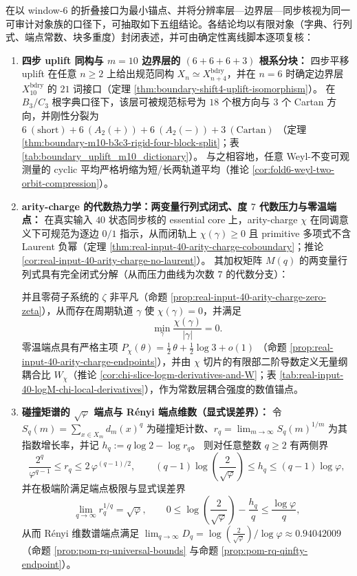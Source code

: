 \begin{theorem}\label{thm:window6-unified-skeleton}
在以 window-\(6\) 的折叠接口为最小锚点、并将分辨率层—边界层—同步核视为同一可审计对象族的口径下，可抽取如下五组结论。各结论均以有限对象（字典、行列式、端点常数、块多重度）封闭表述，并可由确定性离线脚本逐项复核：
\begin{enumerate}
  \item \textbf{四步 uplift 同构与 \(m=10\) 边界层的 \texorpdfstring{$(6+6+6+3)$}{(6+6+6+3)} 根系分块：}
  四步平移 uplift 在任意 \(n\ge 2\) 上给出规范同构 \(X_n\simeq X_{n+4}^{\mathrm{bdry}}\)，并在 \(n=6\) 时确定边界层 \(X_{10}^{\mathrm{bdry}}\) 的 \(21\) 词接口（定理 \ref{thm:boundary-shift4-uplift-isomorphism}）。
  在 \(B_3/C_3\) 根字典口径下，该层可被规范标号为 \(18\) 个根方向与 \(3\) 个 Cartan 方向，并刚性分裂为
  \(
  6\ (\mathrm{short})+6\ (A_2(+))+6\ (A_2(-))+3\ (\mathrm{Cartan})
  \)
  （定理 \ref{thm:boundary-m10-b3c3-rigid-four-block-split}；表 \ref{tab:boundary_uplift_m10_dictionary}）。
  与之相容地，任意 Weyl-不变可观测量的 cyclic 平均严格坍缩为短/长两轨道平均（推论 \ref{cor:fold6-weyl-two-orbit-compression}）。

  \item \textbf{arity-charge 的代数热力学：两变量行列式闭式、度 \(7\) 代数压力与零温端点：}
  在真实输入 \(40\) 状态同步核的 essential core 上，arity-charge \(\chi\) 在同调意义下可规范为逐边 \(0/1\) 指示，从而闭轨上 \(\chi(\gamma)\ge 0\) 且 primitive 多项式不含 Laurent 负幂（定理 \ref{thm:real-input-40-arity-charge-coboundary}；推论 \ref{cor:real-input-40-arity-charge-no-laurent}）。
  其加权矩阵 \(M(q)\) 的两变量行列式具有完全闭式分解（从而压力曲线为次数 \(7\) 的代数分支）：
  
  并且零荷子系统的 \(\zeta\) 非平凡（命题 \ref{prop:real-input-40-arity-charge-zero-zeta}），从而存在周期轨道 \(\gamma\) 使 \(\chi(\gamma)=0\)，并满足
  \[
  \min_{\gamma}\frac{\chi(\gamma)}{|\gamma|}=0.
  \]
  零温端点具有严格主项
  \(
  P_\chi(\theta)=\tfrac12\,\theta+\tfrac12\log 3+o(1)
  \)
  （命题 \ref{prop:real-input-40-arity-charge-endpoints}），并由 \(\chi\) 切片的有限部二阶导数定义无量纲耦合比
  \(W_\chi\)（推论 \ref{cor:chi-slice-logm-derivatives-and-W}；表 \ref{tab:real-input-40-logM-chi-local-derivatives}），作为常数层耦合强度的数值锚点。

  \item \textbf{碰撞矩谱的 \texorpdfstring{$\sqrt{\varphi}$}{sqrt(phi)} 端点与 Rényi 端点维数（显式误差界）：}
  令 \(S_q(m)=\sum_{x\in X_m}d_m(x)^q\) 为碰撞矩计数、\(r_q=\lim_{m\to\infty}S_q(m)^{1/m}\) 为其指数增长率，并记 \(h_q:=q\log 2-\log r_q\)。
  则对任意整数 \(q\ge 2\) 有两侧界
  \[
  \frac{2^q}{\varphi^{q-1}}\le r_q\le 2\,\varphi^{(q-1)/2},
  \qquad
  (q-1)\log\!\left(\frac{2}{\sqrt{\varphi}}\right)\le h_q\le (q-1)\log\varphi,
  \]
  并在极端阶满足端点极限与显式误差界
  \[
  \lim_{q\to\infty} r_q^{1/q}=\sqrt{\varphi},\qquad
  0\le \log\!\left(\frac{2}{\sqrt{\varphi}}\right)-\frac{h_q}{q}\le \frac{\log\varphi}{q},
  \]
  从而 Rényi 维数谱端点满足
  \(
  \lim_{q\to\infty}D_q=\log\!\left(\frac{2}{\sqrt{\varphi}}\right)/\log\varphi\approx 0.94042009
  \)
  （命题 \ref{prop:pom-rq-universal-bounds} 与命题 \ref{prop:pom-rq-qinfty-endpoint}）。


\end{enumerate}
\end{theorem}
